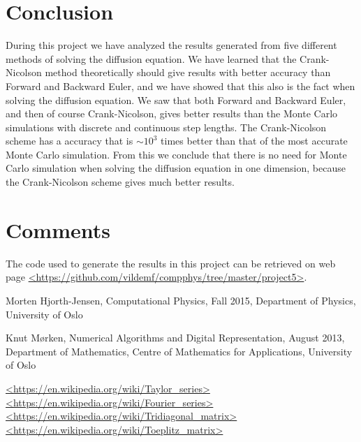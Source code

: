 \documentclass[12pt]{article}
\begin{document}
\begin{flushleft}
\newpage
\section{Conclusion}
During this project we have analyzed the results generated from five different methods of solving the diffusion equation. We have learned that the Crank-Nicolson method theoretically should give results with better accuracy than Forward and Backward Euler, and we have showed that this also is the fact when solving the diffusion equation. We saw that both Forward and Backward Euler, and then of course Crank-Nicolson, gives better results than the Monte Carlo simulations with discrete and continuous step lengths. The Crank-Nicolson scheme has a accuracy that is $\sim 10^3$ times better than that of the most accurate Monte Carlo simulation. From this we conclude that there is no need for Monte Carlo simulation when solving the diffusion equation in one dimension, because the Crank-Nicolson scheme gives much better results.

\section{Comments}
The code used to generate the results in this project can be retrieved on web page \url{<https://github.com/vildemf/compphys/tree/master/project5>}.\\
\newpage
\begin{thebibliography}{9}
Morten Hjorth-Jensen, Computational Physics, Fall 2015, Department of Physics, University of Oslo

Knut Mørken, Numerical Algorithms and Digital Representation, August 2013, Department of Mathematics, Centre of Mathematics for Applications, University of Oslo

\url{<https://en.wikipedia.org/wiki/Taylor_series>}\\

\url{<https://en.wikipedia.org/wiki/Fourier_series>}\\

\url{<https://en.wikipedia.org/wiki/Tridiagonal_matrix>}\\

\url{<https://en.wikipedia.org/wiki/Toeplitz_matrix>}\\

\end{thebibliography}
\end{flushleft}
\end{document}
